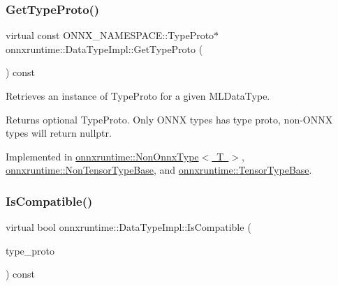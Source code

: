 \mbox{\label{classonnxruntime_1_1DataTypeImpl_a9bea0ebb8f0d94ed5a1b541c160fa33a}} 
\subsubsection{\texorpdfstring{Get\+Type\+Proto()}{GetTypeProto()}}
{\footnotesize\ttfamily virtual const O\+N\+N\+X\+\_\+\+N\+A\+M\+E\+S\+P\+A\+C\+E\+::\+Type\+Proto$\ast$ onnxruntime\+::\+Data\+Type\+Impl\+::\+Get\+Type\+Proto (\begin{DoxyParamCaption}{ }\end{DoxyParamCaption}) const\hspace{0.3cm}{\ttfamily [pure virtual]}}



Retrieves an instance of Type\+Proto for a given M\+L\+Data\+Type. 

\begin{DoxyReturn}{Returns}
optional Type\+Proto. Only O\+N\+NX types has type proto, non-\/\+O\+N\+NX types will return nullptr. 
\end{DoxyReturn}


Implemented in \mbox{\hyperlink{classonnxruntime_1_1NonOnnxType_af0dfad01d0ab54a20a68a7cf56a6367f}{onnxruntime\+::\+Non\+Onnx\+Type$<$ T $>$}}, \mbox{\hyperlink{classonnxruntime_1_1NonTensorTypeBase_a374c7577231883af5e7534c948587bf8}{onnxruntime\+::\+Non\+Tensor\+Type\+Base}}, and \mbox{\hyperlink{classonnxruntime_1_1TensorTypeBase_a1689311da54ea3be4752cbf7dfa6054e}{onnxruntime\+::\+Tensor\+Type\+Base}}.

\mbox{\label{classonnxruntime_1_1DataTypeImpl_a94b2c274bd74068291356c81515d69a1}} 
\subsubsection{\texorpdfstring{Is\+Compatible()}{IsCompatible()}}
{\footnotesize\ttfamily virtual bool onnxruntime\+::\+Data\+Type\+Impl\+::\+Is\+Compatible (\begin{DoxyParamCaption}\item[{const O\+N\+N\+X\+\_\+\+N\+A\+M\+E\+S\+P\+A\+C\+E\+::\+Type\+Proto \&}]{type\+\_\+proto }\end{DoxyParamCaption}) const\hspace{0.3cm}{\ttfamily [pure virtual]}}



